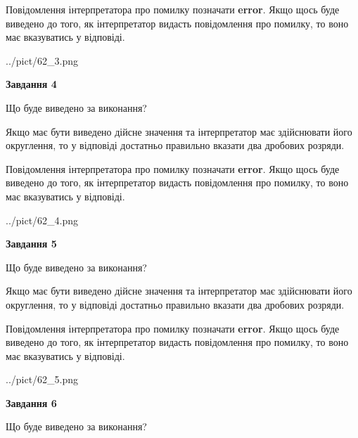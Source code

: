 \documentclass[12pt, ukrainian]{article}
\begin{document}
{\begin {Large}
Повідомлення інтерпретатора про помилку позначати \textbf{error}.
Якщо щось буде виведено до того, як інтерпретатор видасть повідомлення про помилку, 
то воно має вказуватись у відповіді. \par

\begin{center}
	{../pict/62_3.png}
\end{center}
\newpage

{\begin {center}\textbf{Завдання 4}\end {center}}\par
Що буде виведено за виконання? \par

Якщо має бути виведено дійсне значення та інтерпретатор має здійснювати його округлення, 
то у відповіді достатньо правильно вказати два дробових розряди.

Повідомлення інтерпретатора про помилку позначати \textbf{error}.
Якщо щось буде виведено до того, як інтерпретатор видасть повідомлення про помилку, 
то воно має вказуватись у відповіді. \par

\begin{center}
	{../pict/62_4.png}
\end{center}
\newpage

{\begin {center}\textbf{Завдання 5}\end {center}}\par
Що буде виведено за виконання? \par

Якщо має бути виведено дійсне значення та інтерпретатор має здійснювати його округлення, 
то у відповіді достатньо правильно вказати два дробових розряди.

Повідомлення інтерпретатора про помилку позначати \textbf{error}.
Якщо щось буде виведено до того, як інтерпретатор видасть повідомлення про помилку, 
то воно має вказуватись у відповіді. \par

\begin{center}
	{../pict/62_5.png}
\end{center}
\newpage

{\begin {center}\textbf{Завдання 6}\end {center}}\par
Що буде виведено за виконання? \par


\end{Large}}
\end{document}

